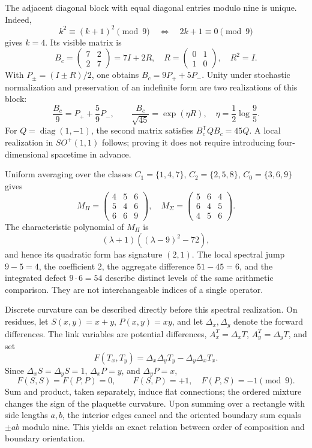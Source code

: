 The adjacent diagonal block with equal diagonal entries modulo nine is unique. Indeed,
\[
 k^2\equiv(k+1)^2\pmod9\quad\Longleftrightarrow\quad2k+1\equiv0\pmod9
\]
gives \(k=4\). Its visible matrix is
\[
 B_c=\begin{pmatrix}7&2\\2&7\end{pmatrix}=7I+2R,
 \quad R=\begin{pmatrix}0&1\\1&0\end{pmatrix},\quad R^2=I.
\]
With \(P_\pm=(I\pm R)/2\), one obtains \(B_c=9P_++5P_-\). Unity under stochastic normalization and preservation of an indefinite form are two realizations of this block:
\[
 \frac{B_c}{9}=P_++\frac59P_-,\qquad
 \frac{B_c}{\sqrt{45}}=\exp(\eta R),\quad\eta=\frac12\log\frac95.
\]
For \(Q=\operatorname{diag}(1,-1)\), the second matrix satisfies \(B_c^{\mathsf T}QB_c=45Q\). A local realization in \(SO^+(1,1)\) follows; proving it does not require introducing four-dimensional spacetime in advance.

Uniform averaging over the classes \(C_1=\{1,4,7\}\), \(C_2=\{2,5,8\}\), \(C_0=\{3,6,9\}\) gives
\[
 M_\Pi=\begin{pmatrix}4&5&6\\5&4&6\\6&6&9\end{pmatrix},\quad
 M_\Sigma=\begin{pmatrix}5&6&4\\6&4&5\\4&5&6\end{pmatrix}.
\]
The characteristic polynomial of \(M_\Pi\) is
\[
 (\lambda+1)((\lambda-9)^2-72),
\]
and hence its quadratic form has signature \((2,1)\). The local spectral jump \(9-5=4\), the coefficient \(2\), the aggregate difference \(51-45=6\), and the integrated defect \(9\cdot6=54\) describe distinct levels of the same arithmetic comparison. They are not interchangeable indices of a single operator.

Discrete curvature can be described directly before this spectral realization. On residues, let \(S(x,y)=x+y\), \(P(x,y)=xy\), and let \(\Delta_x,\Delta_y\) denote the forward differences. The link variables are potential differences, \(A_x^T=\Delta_xT\), \(A_y^T=\Delta_yT\), and set
\[
 F(T_x,T_y)=\Delta_x\Delta_yT_y-\Delta_y\Delta_xT_x.
\]
Since \(\Delta_xS=\Delta_yS=1\), \(\Delta_xP=y\), and \(\Delta_yP=x\),
\begin{equation}
 F(S,S)=F(P,P)=0,\qquad F(S,P)=+1,\quad F(P,S)=-1\pmod9.
\end{equation}
Sum and product, taken separately, induce flat connections; the ordered mixture changes the sign of the plaquette curvature. Upon summing over a rectangle with side lengths \(a,b\), the interior edges cancel and the oriented boundary sum equals \(\pm ab\) modulo nine. This yields an exact relation between order of composition and boundary orientation.

